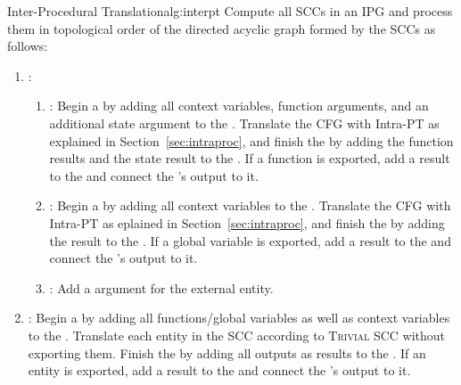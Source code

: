 \begin{informalg}{Inter-Procedural Translation}{alg:interpt}
Compute all SCCs in an IPG and process them in topological order of the directed acyclic
graph formed by the SCCs as follows:
	\begin{enumerate}
		\item \label{item:trivial} :
			\begin{enumerate}
				\item {}: Begin a \lambdanode by adding all context variables,
					function arguments, and an additional state argument to the \lambdaregion. Translate the
					CFG with Intra-PT as explained in Section~\ref{sec:intraproc}, and finish the
					\lambdanode by adding the function results and the state result to the
					\lambdaregion. If a function is exported, add a result to the \omegaregion and connect
					the \lambdanode's output to it.

				\item {}: Begin a \deltanode by adding all context variables
					to the \deltaregion. Translate the CFG with Intra-PT as eplained in
					Section~\ref{sec:intraproc}, and finish the \deltanode by adding the result to the
					\deltaregion. If a global variable is exported, add a result to the \omegaregion and
					connect the \deltanode's output to it.

				\item {}: Add a \omegaregion argument for the external entity.
			\end{enumerate}

		\item \label{item:non-trivial} : Begin a \phinode by adding all
			functions/global variables as well as context variables to the \phiregion. Translate each
			entity in the SCC according to \textsc{Trivial SCC} without exporting them. Finish the
			\phinode by adding all outputs as results to the \phiregion. If an entity is exported, add a
			result to the \omegaregion and connect the \phinode's output to it.
		\vspace*{-\baselineskip}
	\end{enumerate}
\end{informalg}

